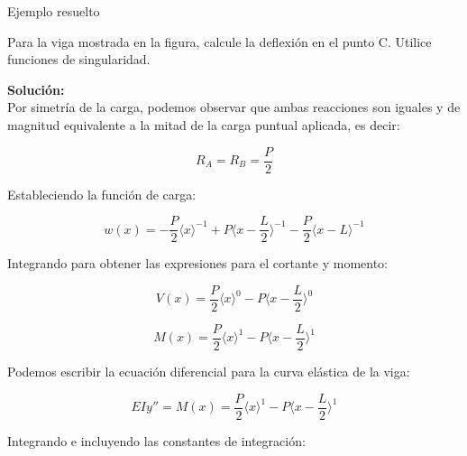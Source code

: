 \documentclass[12pt,letterpaper]{article}
\newcommand{\sifu}[3]{\langle #1 - #2 \rangle^{#3}}
\begin{document}
\begin{ejemplo}{Ejemplo resuelto}

Para la viga mostrada en la figura, calcule la deflexión en el punto C. Utilice funciones de singularidad.

\begin{center}
\end{center}


\textbf{Solución:} \\

Por simetría de la carga, podemos observar que ambas reacciones son iguales y de magnitud equivalente 
a la mitad de la carga puntual aplicada, es decir:

$$ R_A = R_B = \frac{P}{2} $$

Estableciendo la función de carga:

$$ w(x) = - \frac{P}{2} \langle x \rangle^{-1} + P \sifu{x}{\frac{L}{2}}{-1} - \frac{P}{2} \sifu{x}{L}{-1}  $$

Integrando para obtener las expresiones para el cortante y momento:

$$ V(x) = \frac{P}{2} \langle x \rangle^{0} - P \sifu{x}{\frac{L}{2}}{0} $$

$$ M(x) =  \frac{P}{2} \langle x \rangle^{1} - P \sifu{x}{\frac{L}{2}}{1} $$

Podemos escribir la ecuación diferencial para la curva elástica de la viga:

$$ EIy'' = M(x) = \frac{P}{2} \langle x \rangle^{1} - P \sifu{x}{\frac{L}{2}}{1} $$

Integrando e incluyendo las constantes de integración:


\end{ejemplo}
\end{document}
